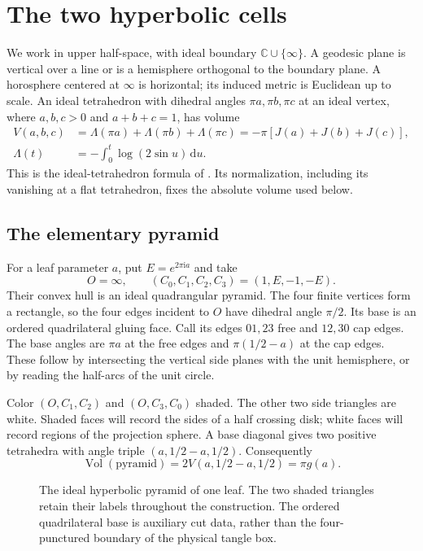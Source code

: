 \documentclass[11pt]{article}
\numberwithin{equation}{section}
\theoremstyle{definition}\newtheorem{definition}[theorem]{Definition}
\theoremstyle{remark}\newtheorem{remark}[theorem]{Remark}
\newcommand{\ii}{\mathrm i}
\newcommand{\dd}{\mathrm d}
\newcommand{\Vol}{\operatorname{Vol}}
\newcommand{\CC}{\mathbb C}
\begin{document}
\section{The two hyperbolic cells}\label{cg:cells}

We work in upper half-space, with ideal boundary
$\CC\cup\{\infty\}$. A geodesic plane is vertical over a line or
is a hemisphere orthogonal to the boundary plane. A horosphere
centered at $\infty$ is horizontal; its induced metric is Euclidean
up to scale. An ideal tetrahedron with dihedral angles
$\pi a,\pi b,\pi c$ at an ideal vertex, where $a,b,c>0$ and
$a+b+c=1$, has volume
\begin{equation}\label{cg:tetra}
\begin{split}
 V(a,b,c)&=\Lambda(\pi a)+\Lambda(\pi b)+\Lambda(\pi c)
        =-\pi[J(a)+J(b)+J(c)],\\
 \Lambda(t)&=-\int_0^t\log(2\sin u)\,\dd u .
\end{split}
\end{equation}
This is the ideal-tetrahedron formula of \cite{Milnor}. Its
normalization, including its vanishing at a flat tetrahedron,
fixes the absolute volume used below.

\subsection{The elementary pyramid}
For a leaf parameter $a$, put $E=e^{2\pi\ii a}$ and take
\begin{equation}\label{cg:leaf-coordinates}
 O=\infty,\qquad (C_0,C_1,C_2,C_3)=(1,E,-1,-E).
\end{equation}
Their convex hull is an ideal quadrangular pyramid. The four finite
vertices form a rectangle, so the four edges incident to $O$ have
dihedral angle $\pi/2$. Its base is an ordered quadrilateral
gluing face. Call its edges $01,23$ free and $12,30$ cap edges.
The base angles are $\pi a$ at the free edges and
$\pi(1/2-a)$ at the cap edges. These follow by intersecting the
vertical side planes with the unit hemisphere, or by reading
the half-arcs of the unit circle.

Color $(O,C_1,C_2)$ and $(O,C_3,C_0)$ shaded.
The other two side triangles are white. Shaded faces will record
the sides of a half crossing disk; white faces will record
regions of the projection sphere. A base diagonal gives
two positive tetrahedra with angle triple $(a,1/2-a,1/2)$.
Consequently
\begin{equation}\label{cg:leaf-volume}
 \Vol(\text{pyramid})=2V(a,1/2-a,1/2)=\pi g(a).
\end{equation}
\begin{figure}[ht]
\centering
\caption{The ideal hyperbolic pyramid of one leaf. The two shaded
triangles retain their labels throughout the construction.
The ordered quadrilateral base is auxiliary cut data, rather than
the four-punctured boundary of the physical tangle box.}
\label{cg:fig-leaf}
\end{figure}
\end{document}
